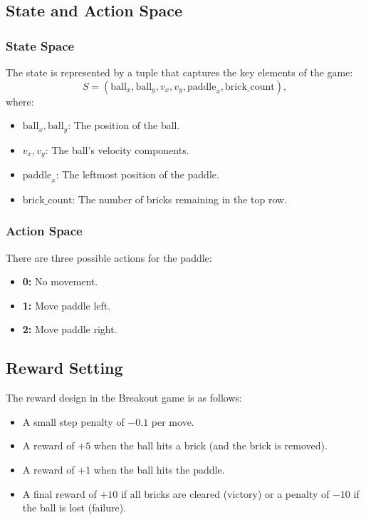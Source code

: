 \documentclass{article}
\begin{document}
\subsection{State and Action Space}
\subsubsection{State Space}
The state is represented by a tuple that captures the key elements of the game:
\[
S = (\text{ball}_x, \text{ball}_y, v_x, v_y, \text{paddle}_x, \text{brick\_count}),
\]
where:
\begin{itemize}
    \item $\text{ball}_x, \text{ball}_y$: The position of the ball.
    \item $v_x, v_y$: The ball's velocity components.
    \item $\text{paddle}_x$: The leftmost position of the paddle.
    \item $\text{brick\_count}$: The number of bricks remaining in the top row.
\end{itemize}

\subsubsection{Action Space}
There are three possible actions for the paddle:
\begin{itemize}
    \item \textbf{0:} No movement.
    \item \textbf{1:} Move paddle left.
    \item \textbf{2:} Move paddle right.
\end{itemize}

\subsection{Reward Setting}
The reward design in the Breakout game is as follows:
\begin{itemize}
    \item A small step penalty of $-0.1$ per move.
    \item A reward of $+5$ when the ball hits a brick (and the brick is removed).
    \item A reward of $+1$ when the ball hits the paddle.
    \item A final reward of $+10$ if all bricks are cleared (victory) or a penalty of $-10$ if the ball is lost (failure).
\end{itemize}
\end{document}
